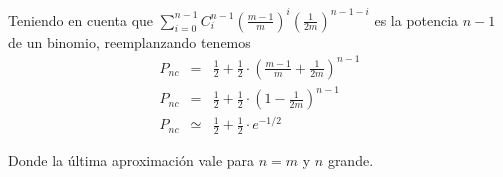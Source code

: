 \documentclass[a4paper,12pt]{article}
\begin{document}
\noindent Teniendo en cuenta que $ \sum_{i=0}^{n-1}
C^{n-1}_{i} \left(\frac{m-1}{m}\right)^i  \left(\frac{1}{2m}\right)^{n-1-i}$ es la potencia $n-1$ de un binomio, reemplanzando tenemos
\begin{eqnarray}
P_{nc} & = & \frac{1}{2} +  \frac{1}{2} \cdot \left(\frac{m-1}{m} + \frac{1}{2m} \right)^{n-1} \\
P_{nc} & = & \frac{1}{2} +  \frac{1}{2} \cdot \left(1- \frac{1}{2m} \right)^{n-1} \\
P_{nc} & \simeq & \frac{1}{2} +  \frac{1}{2} \cdot e^{-1/2} 
\end{eqnarray}

\noindent Donde la última aproximación vale para $n=m$ y $n$ grande.


\vspace{5mm}
\end{document}
